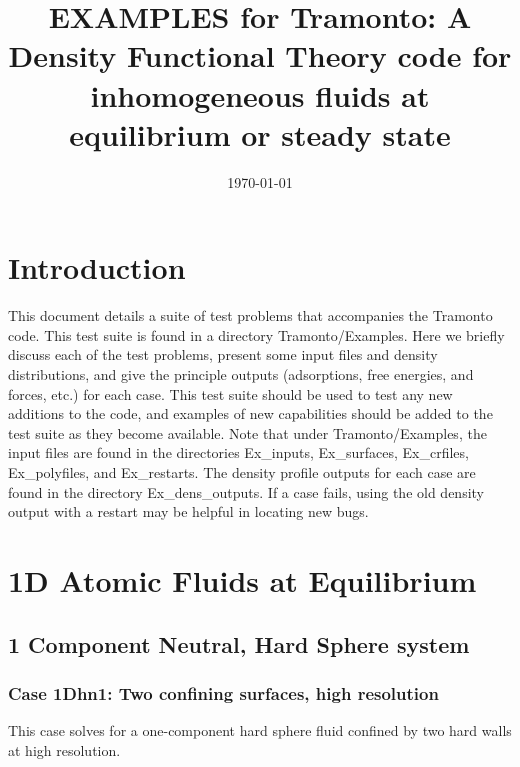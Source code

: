 \documentclass[10pt,onecolumn]{article}
\begin{document}

\title{
   EXAMPLES for Tramonto: A Density Functional Theory code for
   inhomogeneous fluids at equilibrium or steady state}

\date{\today}
\maketitle
%

\tableofcontents

\vfill
\break

\section{Introduction}
This document details a suite of  test problems that
accompanies the Tramonto code.  This test suite is found in a directory
Tramonto/Examples.
Here we briefly discuss each of the test problems, present some 
input files and density distributions, and give the principle outputs (adsorptions, free
energies, and forces, etc.) for each case.  This test suite should
be used to test any new additions to the code, and examples of
new capabilities should be added to the test suite as they become
available.  Note that under Tramonto/Examples, the input files are found in the
directories Ex\_inputs, Ex\_surfaces, Ex\_crfiles, Ex\_polyfiles, and Ex\_restarts.  The
density profile outputs for each case are found in the directory Ex\_dens\_outputs.  If
a case fails, using the old density output with a restart may be helpful in locating new bugs.

\section{1D Atomic Fluids at Equilibrium}
\subsection{1 Component Neutral, Hard Sphere system}
\subsubsection{Case 1Dhn1: Two confining surfaces, high resolution}
This case solves for a one-component hard sphere
fluid confined by two hard walls at high resolution.

\end{document}
